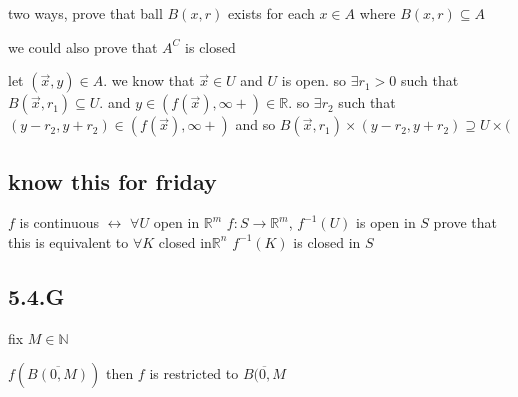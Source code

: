 \documentclass[letterpaper]{article}
\begin{document}
two ways, prove that ball $B(x,r)$ exists for each $x\in A$ where $B(x,r)\subseteq A$

we could also prove that $A^C$ is closed

let $(\vec{x},y)\in A$. we know that $\vec{x}\in U$ and $U$ is open. so $\exists r_1>0$ such that $B(\vec{x},r_1)\subseteq U$. and $y\in (f(\vec{x}),\infty+)\in \mathbb{R}$. so $\exists r_2$ such that $(y-r_2,y+r_2)\in (f(\vec{x}),\infty+)$ and so $B(\vec{x},r_1)\times(y-r_2,y+r_2)\supseteq U\times ($

\subsection*{know this for friday}
$f$ is continuous $\leftrightarrow$ $\forall U$ open in $\mathbb{R}^m$ $f:S\to\mathbb{R}^{m}$, $f^{-1}(U)$ is open in $S$ prove that this is equivalent to $\forall K$ closed in$\mathbb{R}^n$ $f^{-1}(K)$ is closed in $S$

\subsection*{5.4.G}
fix $M\in\mathbb{N}$

$f(\overline{B(0,M)})$ then $f$ is restricted to $\overline{B(0,M}$ 
\end{document}
